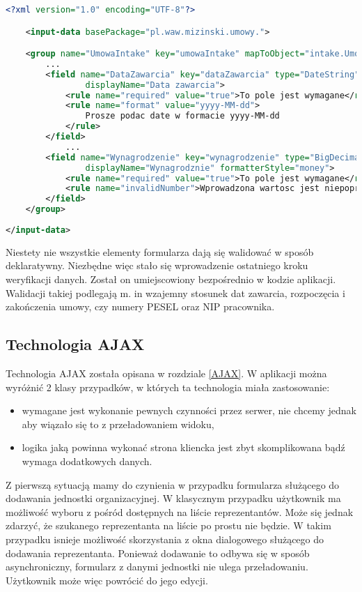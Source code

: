 \begin{lstlisting}[language=XML,style=outcode,showstringspaces=false,caption={Fragment konfiguracji modułu Intake zawierający reguły, jakie powinny spełniać pola formularza do wprowadzania umowy},label={intakeGroupFactory}]
<?xml version="1.0" encoding="UTF-8"?>

	<input-data basePackage="pl.waw.mizinski.umowy.">

	<group name="UmowaIntake" key="umowaIntake" mapToObject="intake.UmowaIntake">
		...
		<field name="DataZawarcia" key="dataZawarcia" type="DateString" 
				displayName="Data zawarcia">
			<rule name="required" value="true">To pole jest wymagane</rule>
			<rule name="format" value="yyyy-MM-dd">
				Prosze podac date w formacie yyyy-MM-dd
			</rule>
		</field>
			...
		<field name="Wynagrodzenie" key="wynagrodzenie" type="BigDecimal" 
				displayName="Wynagrodznie" formatterStyle="money">
			<rule name="required" value="true">To pole jest wymagane</rule>
			<rule name="invalidNumber">Wprowadzona wartosc jest niepoprawna</rule>
		</field>
	</group>
	
</input-data>
\end{lstlisting}

Niestety nie wszystkie elementy formularza dają się walidować w sposób deklaratywny. Niezbędne więc stało się wprowadzenie ostatniego kroku weryfikacji danych. Został on umiejscowiony bezpośrednio w kodzie aplikacji. Walidacji takiej podlegają m. in wzajemny stosunek dat zawarcia, rozpoczęcia i zakończenia umowy, czy numery PESEL oraz NIP pracownika.

\subsection[Technologia AJAX][Technologia AJAX]{Technologia AJAX}
Technologia AJAX została opisana w rozdziale \ref{AJAX}. W aplikacji można wyróżnić 2 klasy przypadków, w których ta technologia miała zastosowanie:
\begin{itemize}
	\item wymagane jest wykonanie pewnych czynności przez serwer, nie chcemy jednak aby wiązało się to z przeładowaniem widoku,
	\item logika jaką powinna wykonać strona kliencka jest zbyt skomplikowana bądź wymaga dodatkowych danych.
\end{itemize}
Z pierwszą sytuacją mamy do czynienia w przypadku formularza służącego do dodawania jednostki organizacyjnej. W klasycznym przypadku użytkownik ma możliwość wyboru z pośród dostępnych na liście reprezentantów. Może się jednak zdarzyć, że szukanego reprezentanta na liście po prostu nie będzie. W takim przypadku isnieje możliwość skorzystania z okna dialogowego służącego do dodawania reprezentanta. Ponieważ dodawanie to odbywa się w sposób asynchroniczny, formularz z danymi jednostki nie ulega przeładowaniu. Użytkownik może więc powrócić do jego edycji.

